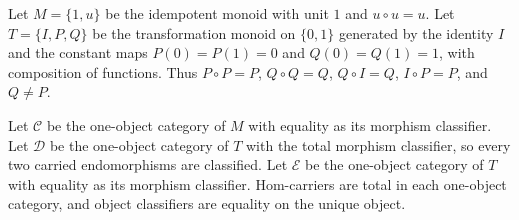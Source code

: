 \begin{definition}
\label{def:two-point-classifier-transport-obstruction-data}
Let $M=\{1,u\}$ be the idempotent monoid with unit $1$ and $u\circ u=u$. Let $T=\{I,P,Q\}$ be the transformation monoid on $\{0,1\}$ generated by the identity $I$ and the constant maps $P(0)=P(1)=0$ and $Q(0)=Q(1)=1$, with composition of functions. Thus $P\circ P=P$, $Q\circ Q=Q$, $Q\circ I=Q$, $I\circ P=P$, and $Q\ne P$.

Let $\mathcal C$ be the one-object category of $M$ with equality as its morphism classifier. Let $\mathcal D$ be the one-object category of $T$ with the total morphism classifier, so every two carried endomorphisms are classified. Let $\mathcal E$ be the one-object category of $T$ with equality as its morphism classifier. Hom-carriers are total in each one-object category, and object classifiers are equality on the unique object.
\end{definition}

